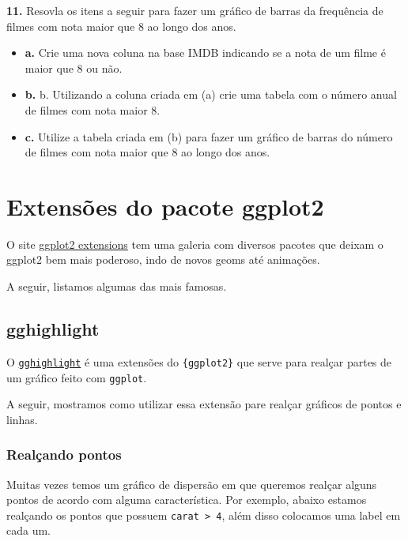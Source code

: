 \documentclass[
]{book}
\begin{document}
\textbf{11.} Resovla os itens a seguir para fazer um gráfico de barras da frequência de filmes com nota maior que 8 ao longo dos anos.

\begin{itemize}
\item
  \textbf{a.} Crie uma nova coluna na base IMDB indicando se a nota de um filme é maior que 8 ou não.
\item
  \textbf{b.} b. Utilizando a coluna criada em (a) crie uma tabela com o número anual de filmes com nota maior 8.
\item
  \textbf{c.} Utilize a tabela criada em (b) para fazer um gráfico de barras do número de filmes com nota maior que 8 ao longo dos anos.
\end{itemize}

\hypertarget{extensuxf5es-do-pacote-ggplot2}{%
\section{Extensões do pacote ggplot2}\label{extensuxf5es-do-pacote-ggplot2}}

O site \href{https://exts.ggplot2.tidyverse.org/}{ggplot2 extensions} tem uma galeria com diversos pacotes que deixam o ggplot2 bem mais poderoso, indo de novos geoms até animações.

A seguir, listamos algumas das mais famosas.

\hypertarget{gghighlight}{%
\subsection{gghighlight}\label{gghighlight}}

O \href{https://yutannihilation.github.io/gghighlight/}{\texttt{gghighlight}} é uma extensões do \texttt{\{ggplot2\}} que serve para realçar partes de um gráfico feito com \texttt{ggplot}.

A seguir, mostramos como utilizar essa extensão pare realçar gráficos de pontos e linhas.

\hypertarget{realuxe7ando-pontos}{%
\subsubsection*{Realçando pontos}\label{realuxe7ando-pontos}}

Muitas vezes temos um gráfico de dispersão em que queremos realçar alguns pontos de acordo com alguma característica. Por exemplo, abaixo estamos realçando os pontos que possuem \texttt{carat\ \textgreater{}\ 4}, além disso colocamos uma label em cada um.
\end{document}
